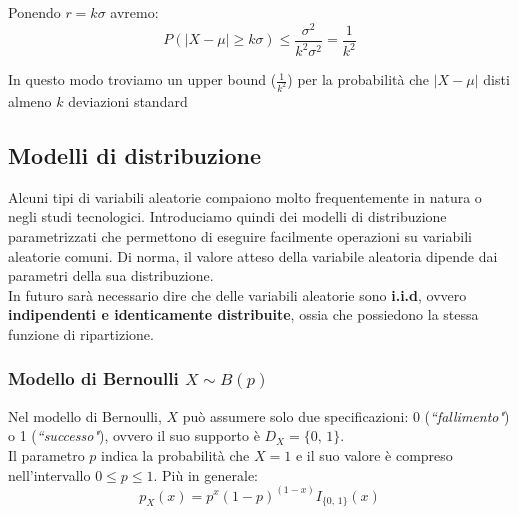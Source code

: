\noindent Ponendo $r = k\sigma$ avremo:
$$
P(|X-\mu|\geq k\sigma) \leq \frac{\sigma^2}{k^2\sigma^2} = \frac{1}{k^2}
$$

\noindent In questo modo troviamo un upper bound ($\frac{1}{k^2}$) per la probabilità che $|X-\mu|$ disti almeno $k$ deviazioni standard

\subsection{Modelli di distribuzione}
Alcuni tipi di variabili aleatorie compaiono molto frequentemente in natura o negli studi tecnologici. Introduciamo quindi dei modelli di distribuzione parametrizzati che permettono di eseguire facilmente operazioni su variabili aleatorie comuni.
\newline
Di norma, il valore atteso della variabile aleatoria dipende dai parametri della sua distribuzione.\\
In futuro sarà necessario dire che delle variabili aleatorie sono \textbf{i.i.d}, ovvero \textbf{indipendenti e identicamente distribuite}, ossia che possiedono la stessa funzione di ripartizione.

\subsubsection{Modello di Bernoulli $X \sim B{(p)}$}
Nel modello di Bernoulli, $X$ può assumere solo due specificazioni: 0 (\textit{``fallimento"}) o 1 (\textit{``successo"}), ovvero il suo supporto è $D_X = \{0, \, 1\}$. \\
Il parametro $p$ indica la probabilità che $X=1$ e il suo valore è compreso nell'intervallo $0 \leq p \leq 1$. Più in generale: \[
p_X(x) = p^x(1-p)^{(1-x)} I_{\{0,\,1\}}(x)
\]

